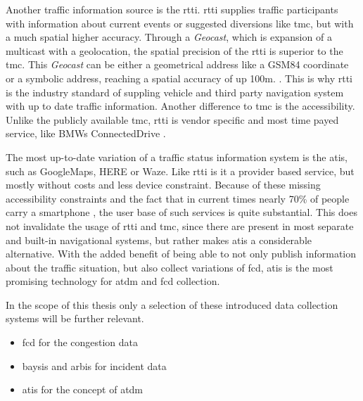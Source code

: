 \documentclass[a4paper,headsepline,footsepline,fontsize=11pt,BCOR=12mm,DIV=12]{report}
\begin{document}
Another traffic information source is the \acrshort{rtti}. \acrshort{rtti} supplies traffic participants with information about current events or suggested diversions like \acrfull{tmc}, but with a much spatial higher accuracy. Through a \textit{Geocast}, which is expansion of a multicast with a geolocation, the spatial precision of the \acrshort{rtti} is superior to the \acrshort{tmc}. This \textit{Geocast} can be either a geometrical address like a GSM84 coordinate or a symbolic address, reaching a spatial accuracy of up 100m.  \cite{LAPID2020,HindenDeering2006,ImielinskiNavas1996}. This is why \acrshort{rtti} is the industry standard of suppling vehicle and third party navigation system with up to date traffic information. Another difference to \acrshort{tmc} is the accessibility. Unlike the publicly available \acrshort{tmc}, \acrshort{rtti} is vendor specific and most time payed service, like BMWs ConnectedDrive \cite{BMW2020}. 


The most up-to-date variation of a traffic status information system is the \acrfull{atis}, such as GoogleMaps, HERE or Waze. Like \acrshort{rtti} is it a provider based service, but mostly without costs and less device constraint. Because of these missing accessibility constraints and the fact that in current times nearly 70\% of people carry a smartphone \cite{IZM2020}, the user base of such services is quite substantial. This does not invalidate the usage of \acrshort{rtti} and \acrshort{tmc}, since there are present in most separate and built-in navigational systems, but rather makes \acrshort{atis} a considerable alternative. With the added benefit of being able to not only publish information about the traffic situation, but also collect variations of \acrshort{fcd}, \acrshort{atis} is the most promising technology for \acrshort{atdm} and \acrshort{fcd} collection. 

\bigskip

In the scope of this thesis only a selection of these introduced data collection systems will be further relevant. 
\begin{itemize}
  \item \acrshort{fcd} for the congestion data
  \item \acrshort{baysis} and \acrshort{arbis} for incident data
  \item \acrshort{atis} for the concept of \acrshort{atdm}
\end{itemize}
\end{document}

